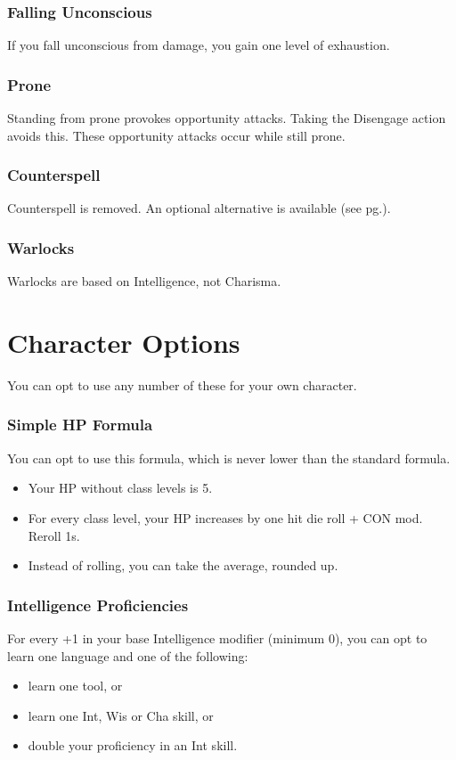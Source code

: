 \documentclass[letterpaper,twocolumn,openany,nodeprecatedcode]{dndbook}
\newcommand{\pg}[1]{pg.\pageref{#1}}
\newcommand{\see}[1]{(see \pg{#1})}
\begin{document}
\subsection{Falling Unconscious}
If you fall unconscious from damage, you gain one level of exhaustion.

\subsection{Prone}
Standing from prone provokes opportunity attacks. Taking the Disengage action avoids this.
These opportunity attacks occur while still prone.

\subsection{Counterspell}
Counterspell is removed. An optional alternative is available \see{counterspell}.

\subsection{Warlocks}
Warlocks are based on Intelligence, not Charisma.










\chapter{Character Options}
You can opt to use any number of these for your own character.

\subsection{Simple HP Formula}
You can opt to use this formula, which is never lower than the standard formula.
\begin{itemize}
\item Your HP without class levels is 5.
\item For every class level, your HP increases by one hit die roll + CON mod. Reroll 1s. 
\item Instead of rolling, you can take the average, rounded up.
\end{itemize}

\subsection{Intelligence Proficiencies}
For every +1 in your base Intelligence modifier (minimum 0), you can opt to learn one language and one of the following:
\begin{itemize}
    \item learn one tool, or
    \item learn one Int, Wis or Cha skill, or
    \item double your proficiency in an Int skill.
\end{itemize}
\end{document}
